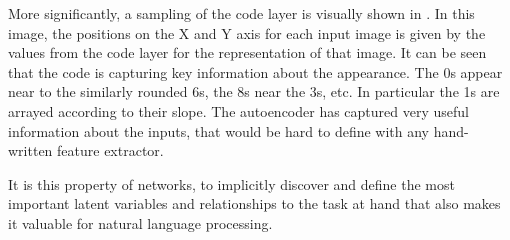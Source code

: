 \documentclass[12pt,parskip]{komatufte}
\begin{document}


More significantly, a sampling of the code layer is visually shown in .
In this image, the positions on the X and Y axis for each input image is given by the values from the code layer for the representation of that image.
It can be seen that the code is capturing key information about the appearance.
The 0s appear near to the similarly rounded 6s,
the 8s near the 3s, etc.
In particular the 1s are arrayed according to their slope.
The autoencoder has captured very useful information about the inputs, that would be hard to define with any hand-written feature extractor.

It is this property of networks, to implicitly discover and define the most important latent variables and relationships to the task at hand that also makes it valuable for natural language processing.
\end{document}
